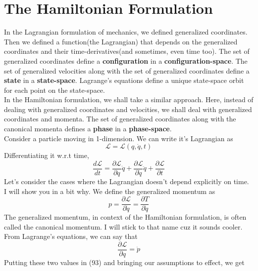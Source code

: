 \documentclass[12pt]{article}
\begin{document}
    \section{The Hamiltonian Formulation}
    In the Lagrangian formulation of mechanics, we defined generalized coordinates. Then we defined a function(the Lagrangian) that depends
    on the generalized coordinates and their time-derivatives(and sometimes, even time too).
    The set of generalized coordinates define a \textbf{configuration} in a \textbf{configuration-space}. 
    The set of generalized velocities along with the set of generalized coordinates define a \textbf{state} in a \textbf{state-space}.
    Lagrange's equations define a unique state-space orbit for each point on the state-space.
    \\
    In the Hamiltonian formulation, we shall take a similar approach. Here, instead of dealing with generalized coordinates and velocities, we shall deal with
    generalized coordinates and momenta. The set of generalized coordinates along with the canonical momenta defines a \textbf{phase} in a \textbf{phase-space}.
    \\
    Consider a particle moving in 1-dimension. We can write it's Lagrangian as
    \begin{equation}
        \mathcal{L}=\mathcal{L}(q,\dot{q},t)
    \end{equation}
    Differentiating it w.r.t time,
    \begin{equation}
        \frac{d\mathcal{L}}{dt}=\frac{\partial \mathcal{L}}{\partial q}\dot{q}+\frac{\partial \mathcal{L}}{\partial \dot{q}}\ddot{q}+\frac{\partial \mathcal{L}}{\partial t}
    \end{equation}
    Let's consider the cases where the Lagrangian doesn't depend explicitly on time. I will show you in a bit why.
    We define the generalized momentum as
    \begin{equation}
        p = \frac{\partial \mathcal{L}}{\partial \dot{q}}=\frac{\partial T}{\partial \dot{q}}
    \end{equation} 
    The generalized momentum, in context of the Hamiltonian formulation, is often called the canonical momentum. I will stick to that name cuz it sounds cooler.
    \\ From Lagrange's equations, we can say that
    \begin{equation}
        \frac{\partial \mathcal{L}}{\partial q}=\dot{p}
    \end{equation}
    Putting these two values in (93) and bringing our assumptions to effect, we get
\end{document}
